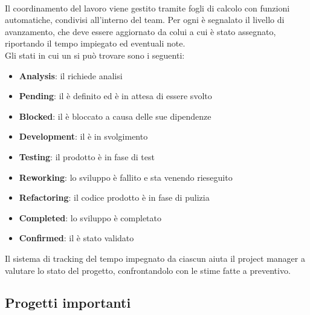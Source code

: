    \\
   Il coordinamento del lavoro viene gestito tramite fogli di calcolo con funzioni automatiche, condivisi all'interno del team. Per ogni  è segnalato il livello di avanzamento, che deve essere aggiornato da colui a cui è stato assegnato, riportando il tempo impiegato ed eventuali note.
   \\
   Gli stati in cui un  si può trovare sono i seguenti:
   \begin{itemize}
      \item{\textbf{Analysis}: il  richiede analisi}
      \item{\textbf{Pending}: il  è definito ed è in attesa di essere svolto}
      \item{\textbf{Blocked}: il  è bloccato a causa delle sue dipendenze}
      \item{\textbf{Development}: il  è in svolgimento}
      \item{\textbf{Testing}: il prodotto è in fase di test}
      \item{\textbf{Reworking}: lo sviluppo è fallito e sta venendo rieseguito}
      \item{\textbf{Refactoring}: il codice prodotto è in fase di pulizia}
      \item{\textbf{Completed}: lo sviluppo è completato}
      \item{\textbf{Confirmed}: il  è stato validato}
   \end{itemize}
   Il sistema di tracking del tempo impegnato da ciascun  aiuta il project manager a valutare lo stato del progetto, confrontandolo con le stime fatte a preventivo.

   \subsection{Progetti importanti}

